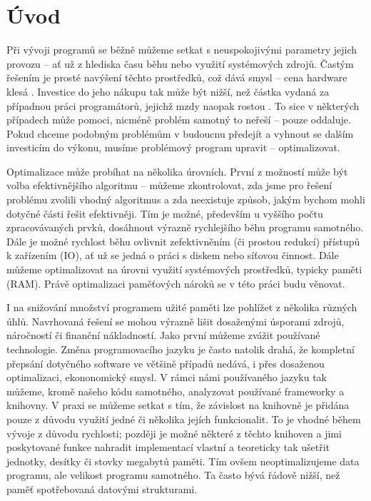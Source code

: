 \chapter{Úvod}
Při vývoji programů se běžně můžeme setkat s neuspokojivými parametry jejich provozu -- ať už z hlediska času běhu nebo využití systémových zdrojů. Častým řešením je prosté navýšení těchto prostředků, což dává smysl -- cena hardware klesá \cite{mooreslaw}. Investice do jeho nákupu tak může být nižší, než částka vydaná za případnou práci programátorů, jejichž mzdy naopak rostou \cite{devsalary}. To sice v některých případech může pomoci, nicméně problém samotný to neřeší -- pouze oddaluje. Pokud chceme podobným problémům v budoucnu předejít a vyhnout se dalším investicím do výkonu, musíme problémový program upravit -- optimalizovat.

Optimalizace může probíhat na několika úrovních. První z možností může být volba efektivnějšího algoritmu -- můžeme zkontrolovat, zda jsme pro řešení problému zvolili vhodný algoritmus a zda neexistuje způsob, jakým bychom mohli dotyčné části řešit efektivněji. Tím je možné, především u vyššího počtu zpracovávaných prvků, dosáhnout výrazně rychlejšího běhu programu samotného. Dále je možné rychlost běhu ovlivnit zefektivněním (či prostou redukcí) přístupů k zařízením (IO), ať už se jedná o práci s diskem nebo síťovou činnost. Dále můžeme optimalizovat na úrovni využití systémových prostředků, typicky paměti (RAM). Právě optimalizaci paměťových nároků se v této práci budu věnovat.

I na snižování množství programem užité paměti lze pohlížet z několika různých úhlů. Navrhovaná řešení se mohou výrazně lišit dosaženými úsporami zdrojů, náročností či finanční nákladností. Jako první můžeme zvážit používané technologie. Změna programovacího jazyku je často natolik drahá, že kompletní přepsání dotyčného software ve většině případů nedává, i přes dosaženou optimalizaci, ekononomický smysl. V rámci námi používaného jazyku tak můžeme, kromě našeho kódu samotného, analyzovat používané frameworky a knihovny. V praxi se můžeme setkat s tím, že závislost na knihovně je přidána pouze z důvodu využití jedné či několika jejích funkcionalit. To je vhodné během vývoje z důvodu rychlosti; později je možné některé z těchto knihoven a jimi poskytované funkce nahradit implementací vlastní a teoreticky tak ušetřit jednotky, desítky či stovky megabytů paměti. Tím ovšem neoptimalizujeme data programu, ale velikost programu samotného. Ta často bývá řádově nižší, než paměť spotřebovaná datovými strukturami.


